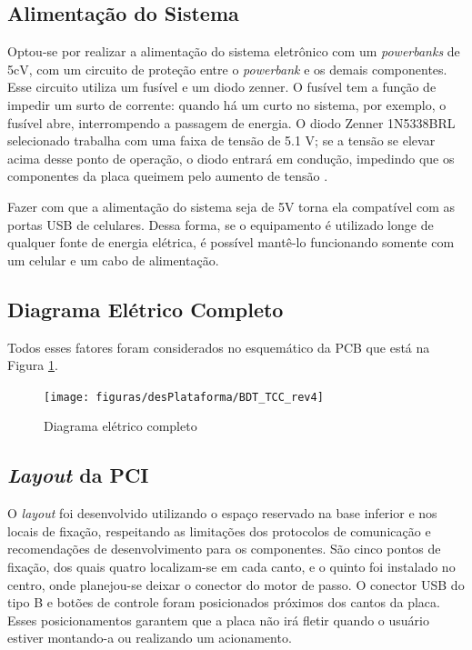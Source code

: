\subsection{Alimentação do Sistema}
Optou-se por realizar a alimentação do sistema eletrônico com um \textit{powerbanks} de 5cV, com um circuito de proteção entre o \textit{powerbank} e os demais componentes. Esse circuito utiliza um fusível e um diodo zenner. O fusível tem a função de impedir um surto de corrente: quando há um curto no sistema, por exemplo, o fusível abre, interrompendo a passagem de energia. O diodo Zenner 1N5338BRL selecionado trabalha com uma faixa de tensão de 5.1 V; se a tensão se elevar acima desse ponto de operação, o diodo entrará em condução, impedindo que os componentes da placa queimem pelo aumento de tensão \cite{man:diodozenner}. 

Fazer com que a alimentação do sistema seja de 5V torna ela compatível com as portas USB de celulares. Dessa forma, se o equipamento é utilizado longe de qualquer fonte de energia elétrica, é possível mantê-lo funcionando somente com um celular e um cabo de alimentação. 

\subsection{Diagrama Elétrico Completo}

Todos esses fatores foram considerados no esquemático da PCB que está na Figura \ref{fig:BDT_TCC_rev4}. 
\begin{figure}[!htb]
	\centering
	\caption{Diagrama elétrico completo}
	\texttt{[image: figuras/desPlataforma/BDT\_TCC\_rev4]}
	\label{fig:BDT_TCC_rev4}
\end{figure}




\subsection{\textit{Layout} da PCI}
O \textit{layout} foi desenvolvido utilizando o espaço reservado na base inferior e nos locais de fixação, respeitando as limitações dos protocolos de comunicação e recomendações de desenvolvimento para os componentes. São cinco pontos de fixação, dos quais quatro localizam-se em cada canto, e o quinto foi instalado no centro, onde planejou-se deixar o conector do motor de passo. O conector USB do tipo B e botões de controle foram posicionados próximos dos cantos da placa. Esses posicionamentos garantem que a placa não irá fletir quando o usuário estiver montando-a ou realizando um acionamento. 


